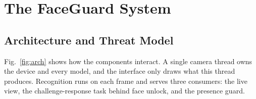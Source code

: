 \documentclass[journal]{IEEEtran}
\newcommand{\sys}{FaceGuard}
\begin{document}
\section{The \sys{} System}\label{sec:system}

\subsection{Architecture and Threat Model}
Fig.~\ref{fig:arch} shows how the components interact. A single camera thread owns the device and every model, and the interface only draws what this thread produces. Recognition runs on each frame and serves three consumers: the live view, the challenge-response task behind face unlock, and the presence guard.
\end{document}
